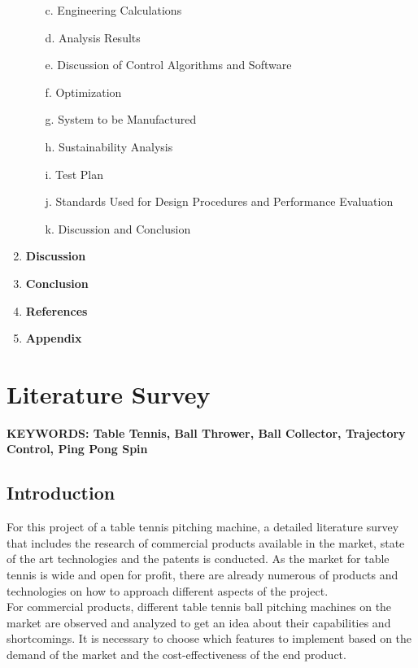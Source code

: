 \documentclass[12pt]{report}
\begin{document}
\begin{enumerate}
\begin{enumerate}
        \item[c.] Engineering Calculations
        \item[d.] Analysis Results
        \item[e.] Discussion of Control Algorithms and Software
        \item[f.] Optimization
        \item[g.] System to be Manufactured
        \item[h.] Sustainability Analysis
        \item[i.] Test Plan
        \item[j.] Standards Used for Design Procedures and Performance Evaluation
        \item[k.] Discussion and Conclusion
    \end{enumerate}
    \item \textbf{Discussion}
    \item \textbf{Conclusion}
    \item \textbf{References}
    \item \textbf{Appendix}
\end{enumerate}

\chapter{Literature Survey}

\begin{center}
    \vspace{1em} %
    \vspace{1em} %
    \textbf{KEYWORDS: Table Tennis, Ball Thrower, Ball Collector, Trajectory Control, Ping Pong Spin}
\end{center}

\section{Introduction}

For this project of a table tennis pitching machine, a detailed literature survey that includes the research of commercial products available in the market, state of the art technologies and the patents is conducted. As the market for table tennis is wide and open for profit, there are already numerous of products and technologies on how to approach different aspects of the project.\\

For commercial products, different table tennis ball pitching machines on the market are observed and analyzed to get an idea about their capabilities and shortcomings. It is necessary to choose which features to implement based on the demand of the market and the cost-effectiveness of the end product. \\
\end{document}
